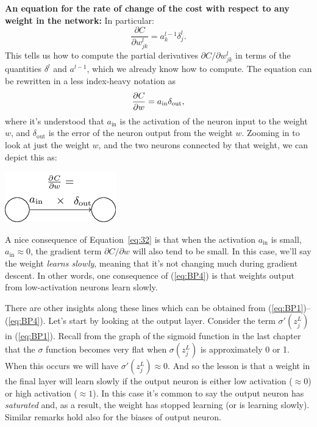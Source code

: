 \documentclass[a4paper,twoside,10pt]{book}
\begin{document}
\textbf{An equation for the rate of change of the cost with respect to any weight in the network:} In particular:
\begin{equation}
\frac{\partial C}{\partial w^l_{jk}} = a^{l-1}_k \delta^l_j.
\tag{BP4}
\label{eq:BP4}
\end{equation}
This tells us how to compute the partial derivatives $\partial{}C/\partial{}w^l_{jk}$ in terms of the quantities $\delta^l$ and $a^{l-1}$, which we already know how to compute. The equation can be rewritten in a less index-heavy notation as
\begin{equation}
\frac{\partial C}{\partial w} = a_{\rm in} \delta_{\rm out},
\label{eq:32}
\end{equation}
where it's understood that $a_\mathrm{in}$ is the activation of the neuron input to the weight $w$, and $\delta_\mathrm{out}$ is the error of the neuron output from the weight $w$. Zooming in to look at just the weight $w$, and the two neurons connected by that weight, we can depict this as:

\begin{center}
	\includegraphics[width=0.35\linewidth]{./figures/ch2/tikz20}
\end{center}
A nice consequence of Equation~\ref{eq:32} is that when the activation $a_\mathrm{in}$ is small, $a_\mathrm{in}\approx0$, the gradient term $\partial{}C/\partial{}w$ will also tend to be small. In this case, we'll say the weight \textit{learns slowly}, meaning that it's not changing much during gradient descent. In other words, one consequence of (\ref{eq:BP4}) is that weights output from low-activation neurons learn slowly.

There are other insights along these lines which can be obtained from (\ref{eq:BP1})--(\ref{eq:BP4}). Let's start by looking at the output layer. Consider the term $\sigma'(z^L_j)$ in (\ref{eq:BP1}). Recall from the graph of the sigmoid function in the last chapter that the $\sigma$ function becomes very flat when $\sigma(z^L_j)$ is approximately 0 or 1. When this occurs we will have $\sigma'(z^L_j)\approx0$. And so the lesson is that a weight in the final layer will learn slowly if the output neuron is either low activation ($\approx0$) or high activation ($\approx1$). In this case it's common to say the output neuron has \textit{saturated} and, as a result, the weight has stopped learning (or is learning slowly). Similar remarks hold also for the biases of output neuron.
\end{document}
